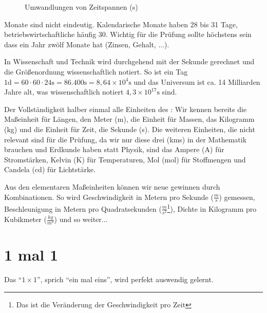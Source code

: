 \documentclass[a4paper]{book}%
\theoremstyle{definition}
\begin{document}
\begin{figure}
  \caption{Umwandlungen von Zeitspannen (s)}\label{fig:sisystemMUmwandlungenS}
\end{figure}

Monate sind nicht eindeutig. Kalendarische Monate haben 28 bis 31 Tage, betriebswirtschaftliche häufig 30. Wichtig für die Prüfung sollte höchstens sein dass ein Jahr zwölf Monate hat (Zinsen, Gehalt, ...).

In Wissenschaft und Technik wird durchgehend mit der Sekunde gerechnet und die Größenordnung wissenschaftlich notiert. So ist ein Tag $1 \text{d} = 60 \cdot 60 \cdot 24 \text{s} = 86.400\text{s} = 8,64 \times 10^4 \text{s}$ und das Universum ist ca. 14 Milliarden Jahre alt, was wissenschaftlich notiert $4,3 \times 10^{17}\text{s}$ sind.

Der Vollständigkeit halber einmal alle Einheiten des : Wir kennen bereits die Maßeinheit für Längen, den Meter (m), die Einheit für Massen, das Kilogramm (kg) und die Einheit für Zeit, die Sekunde (s). Die weiteren Einheiten, die nicht relevant sind für die Prüfung, da wir nur diese drei (kms) in der Mathematik brauchen und Erdkunde haben statt Physik, sind das Ampere (A) für Stromstärken, Kelvin (K) für Temperaturen, Mol (mol) für Stoffmengen und Candela (cd) für Lichtstärke.

Aus den elementaren Maßeinheiten können wir neue gewinnen durch Kombinationen. So wird Geschwindigkeit in Metern pro Sekunde ($\frac{m}{s}$) gemessen, Beschleunigung in Metern pro Quadratsekunden ($\frac{m}{s^2}$\footnote{Das ist die Veränderung der Geschwindigkeit pro Zeit}), Dichte in Kilogramm pro Kubikmeter ($\frac{kg}{m^3}$) und so weiter...


\chapter{1 mal 1}

Das \enquote{$1 \times 1$}, sprich \enquote{ein mal eins}, wird perfekt auswendig gelernt.
\end{document}
